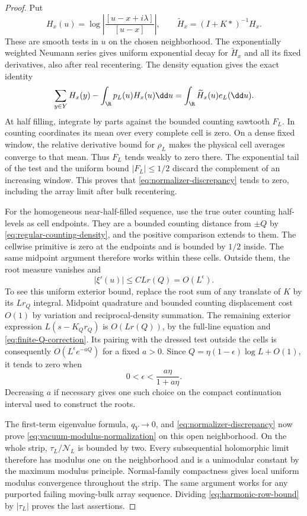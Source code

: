 \begin{proof}
Put
\[
 H_x(u)=\log\left|\frac{[u-x+i\lambda]}{[u-x]}\right|,
 \qquad
 \widetilde H_x=(I+K*)^{-1}H_x.
\]
These are smooth tests in $u$ on the chosen neighborhood.
The exponentially weighted Neumann series gives uniform exponential
decay for $\widetilde H_x$ and all its fixed derivatives, also
after real recentering.  The density equation gives the exact
identity
\begin{equation}\label{eq:normalizer-discrepancy}
 \sum_{y\in Y}H_x(y)-\int_\R p_L(u)H_x(u)\dd u
       =\int_\R\widetilde H_x(u)e_L(\dd u).
\end{equation}
At half filling, integrate by parts against the bounded counting
sawtooth $F_L$.  In counting coordinates its mean over every
complete cell is zero.  On a dense fixed window, the relative
derivative bound for $\rho_L$ makes the physical cell averages
converge to that mean.  Thus $F_L$ tends weakly to zero there.
The exponential tail of the test and the uniform bound $|F_L|\le1/2$
discard the complement of an increasing window.  This proves
that \eqref{eq:normalizer-discrepancy} tends to zero, including
the array limit after bulk recentering.

For the homogeneous near-half-filled sequence, use the true
outer counting half-levels as cell endpoints.  They are a bounded
counting distance from $\pm Q$ by
\eqref{eq:regular-counting-density}, and the positive comparison
extends to them.  The cellwise primitive is zero at the endpoints
and is bounded by $1/2$ inside.  The same midpoint argument
therefore works within these cells.
Outside them, the root measure vanishes and
\[
 |\xi'(u)|\le C Lr(Q)=O(L^\epsilon).
\]
To see this uniform exterior bound, replace the root sum of any
translate of $K$ by its $Lr_Q$ integral.  Midpoint quadrature and
bounded counting displacement cost $O(1)$ by variation and
reciprocal-density summation.  The remaining exterior expression
$L(s-K_Qr_Q)$ is $O(Lr(Q))$, by the full-line equation and
\eqref{eq:finite-Q-correction}.  Its pairing with the dressed
test outside the cells is consequently
$O(L^\epsilon e^{-aQ})$ for a fixed $a>0$.
Since $Q=\eta(1-\epsilon)\log L+O(1)$, it tends to zero when
\begin{equation}\label{eq:epsilon-choice}
 0<\epsilon<\frac{a\eta}{1+a\eta}.
\end{equation}
Decreasing $a$ if necessary gives one such choice on the compact
continuation interval used to construct the roots.

The first-term eigenvalue formula, $q_Y\to0$, and
\eqref{eq:normalizer-discrepancy} now prove
\eqref{eq:vacuum-modulus-normalization} on this open neighborhood.
On the whole strip, $\tau_L/\mathcal N_L$ is bounded by two.
Every subsequential holomorphic limit therefore has modulus one
on the neighborhood and is a unimodular constant by the maximum
modulus principle.  Normal-family compactness gives local uniform
modulus convergence throughout the strip.  The same argument
works for any purported failing moving-bulk array sequence.
Dividing \eqref{eq:harmonic-row-bound} by $|\tau_L|$ proves the
last assertions.
\end{proof}

